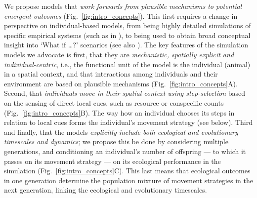 We propose models that \textit{work forwards from plausible mechanisms to potential emergent outcomes} (Fig.~\ref{fig:intro_concepts}).
This first requires a change in perspective on individual-based models, from being highly detailed simulations of specific empirical systems (such as in \cite{diaz2021,stillman2010,bocedi2014}), to being used to obtain broad conceptual insight into `What if \ldots?' scenarios (see also \cite{white2018,gupte2021a,gupte2022c,netz2021,getz2015,getz2016}).
The key features of the simulation models we advocate is first, that they are \textit{mechanistic, spatially explicit and individual-centric}, i.e., the functional unit of the model is the individual (animal) in a spatial context, and that interactions among individuals and their environment are based on plausible mechanisms (Fig.~\ref{fig:intro_concepts}A).
Second, that \textit{individuals move in their spatial context using step-selection} based on the sensing of direct local cues, such as resource or conspecific counts (Fig.~\ref{fig:intro_concepts}B).
The way how an individual chooses its steps in relation to local cues forms the individual's movement strategy (see below).
Third and finally, that the models \textit{explicitly include both ecological and evolutionary timescales and dynamics}; we propose this be done by considering multiple generations, and conditioning an individual's number of offspring --- to which it passes on its movement strategy --- on its ecological performance in the simulation (Fig.~\ref{fig:intro_concepts}C).
This last means that ecological outcomes in one generation determine the population mixture of movement strategies in the next generation, linking the ecological and evolutionary timescales.

